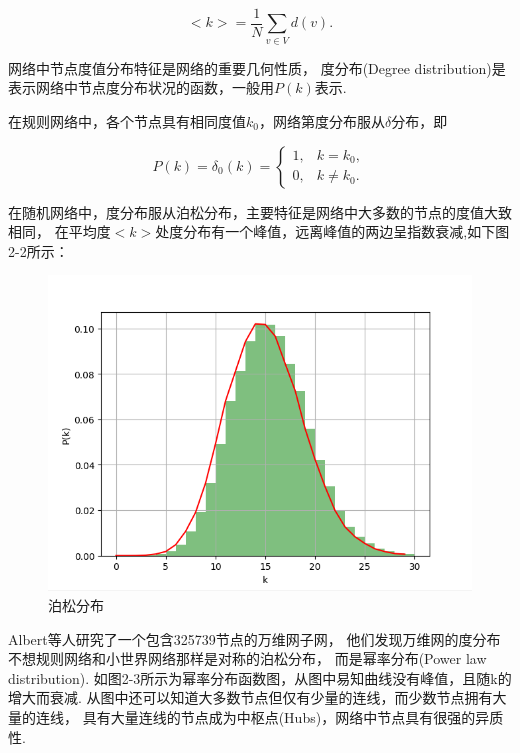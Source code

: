 \documentclass[bachelor,adobefonts]{jnuthesis}
\begin{document}
\begin{equation}
<k>  = \frac{1}{N} \sum_{v \in V}^{}d(v).
\end{equation}

网络中节点度值分布特征是网络的重要几何性质，
度分布(Degree distribution)是表示网络中节点度分布状况的函数，一般用$P(k)$表示.

在规则网络中，各个节点具有相同度值$k_0$，网络第度分布服从$\delta$分布，即

\begin{equation}
  P(k) = \delta_0(k) = 
  \left\{
    \begin{array}{lr}
      1, & k = k_0,\\
      0, & k\neq k_0.
    \end{array}
  \right.
\end{equation}

在随机网络中，度分布服从泊松分布，主要特征是网络中大多数的节点的度值大致相同，
在平均度$<k>$处度分布有一个峰值，远离峰值的两边呈指数衰减,如下图2-2所示：
\begin{figure}[h!]
  \centering
  \includegraphics[width=0.6\linewidth]{Wposong.png}
  \caption{泊松分布}
\end{figure}

Albert等人研究了一个包含325739节点的万维网子网，
他们发现万维网的度分布不想规则网络和小世界网络那样是对称的泊松分布，
而是幂率分布(Power law distribution).
如图2-3所示为幂率分布函数图，从图中易知曲线没有峰值，且随k的增大而衰减.
从图中还可以知道大多数节点但仅有少量的连线，而少数节点拥有大量的连线，
具有大量连线的节点成为中枢点(Hubs)，网络中节点具有很强的异质性.
\end{document}

